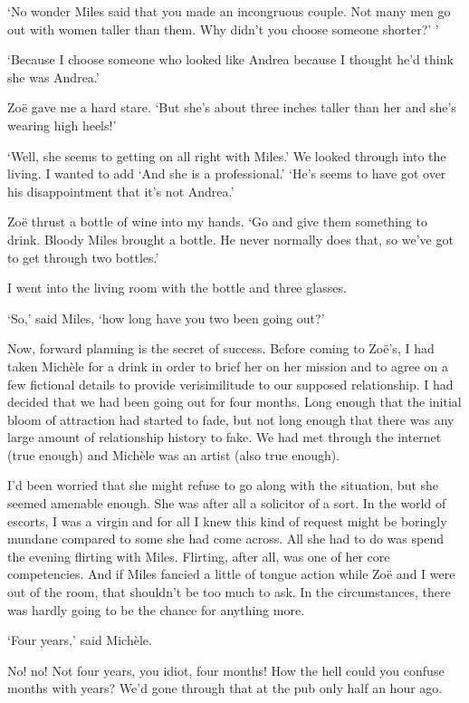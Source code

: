`No wonder Miles said that you made an incongruous couple. Not many
men go out with women taller than them. Why didn't you choose
someone shorter?' '

`Because I choose someone who looked like Andrea because I thought
he'd think she was Andrea.'

Zo{\"e} gave me a hard stare. `But she's about three inches taller
than her and she's wearing high heels!'

`Well, she seems to getting on all right with Miles.' We looked
through into the living. I wanted to add `And she is a
professional.' `He's seems to have got over his disappointment that
it's not Andrea.'

Zo{\"e} thrust a bottle of wine into my hands. `Go and give them
something to drink. Bloody Miles brought a bottle. He never normally
does that, so we've got to get through two bottles.'

I went into the living room with the bottle and three glasses.

`So,' said Miles, `how long have you two been going out?'

Now, forward planning is the secret of success. Before coming to
Zo{\"e}'s, I had taken Mich{\`e}le for a drink in order to brief her
on her mission and to agree on a few fictional details to provide
verisimilitude to our supposed relationship. I had decided that we
had been going out for four months. Long enough that the initial
bloom of attraction had started to fade, but not long enough that
there was any large amount of relationship history to fake. We had
met through the internet (true enough) and Mich{\`e}le was an artist
(also true enough).

I'd been worried that she might refuse to go along with the
situation, but she seemed amenable enough. She was after all a
solicitor of a sort. In the world of escorts, I was a virgin and
for all I knew this kind of request might be boringly mundane
compared to some she had come across. All she had to do was spend the
evening flirting with Miles. Flirting, after all, was one of her core
competencies. And if Miles fancied a little of tongue action while
Zo{\"e} and I were out of the room, that shouldn't be too much to
ask. In the circumstances, there was hardly going to be the chance
for anything more.

`Four years,' said Mich{\`e}le.

No! no! Not four years, you idiot, four {\twelveit months!} How the
hell could you confuse months with years? We'd gone through that at
the pub only half an hour ago.

